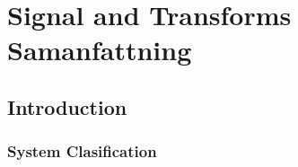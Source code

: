 %
%
%
%
%

\chapter{Signal and Transforms Samanfattning}

\newpage

\section{Introduction}
\subsection{System Clasification}

